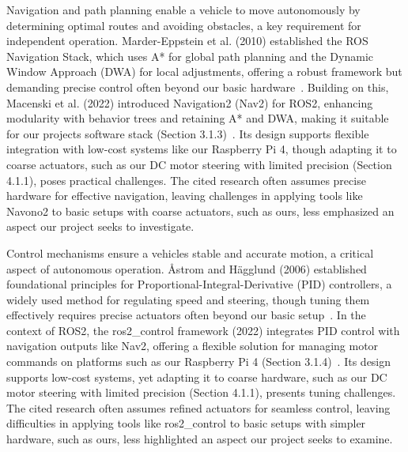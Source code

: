 \documentclass[english,project]{buwthesis}
\begin{document}
Navigation and path planning enable a vehicle to move autonomously by determining optimal routes and avoiding obstacles, a key requirement for independent operation. Marder-Eppstein et al. (2010) established the ROS Navigation Stack, which uses A* for global path planning and the Dynamic Window Approach (DWA) for local adjustments, offering a robust framework but demanding precise control often beyond our basic hardware~\cite{marder2010navigation}. Building on this, Macenski et al. (2022) introduced Navigation2 (Nav2) for ROS2, enhancing modularity with behavior trees and retaining A* and DWA, making it suitable for our project\textquotesingle s software stack (Section 3.1.3)~\cite{macenski2022nav2}. Its design supports flexible integration with low-cost systems like our Raspberry Pi 4, though adapting it to coarse actuators, such as our DC motor steering with limited precision (Section 4.1.1), poses practical challenges. The cited research often assumes precise hardware for effective navigation, leaving challenges in applying tools like Navono2 to basic setups with coarse actuators, such as ours, less emphasized an aspect our project seeks to investigate.

Control mechanisms ensure a vehicle\textquotesingle s stable and accurate motion, a critical aspect of autonomous operation. \AA strom and H\"agglund
 (2006) established foundational principles for Proportional-Integral-Derivative (PID) controllers, a widely used method for regulating speed and steering, though tuning them effectively requires precise actuators often beyond our basic setup~\cite{astrom2006pid}. In the context of ROS2, the ros2\_control framework (2022) integrates PID control with navigation outputs like Nav2, offering a flexible solution for managing motor commands on platforms such as our Raspberry Pi 4 (Section 3.1.4)~\cite{ros2humble2022control}. Its design supports low-cost systems, yet adapting it to coarse hardware, such as our DC motor steering with limited precision (Section 4.1.1), presents tuning challenges. The cited research often assumes refined actuators for seamless control, leaving difficulties in applying tools like ros2\_control to basic setups with simpler hardware, such as ours, less highlighted an aspect our project seeks to examine.
\end{document}
